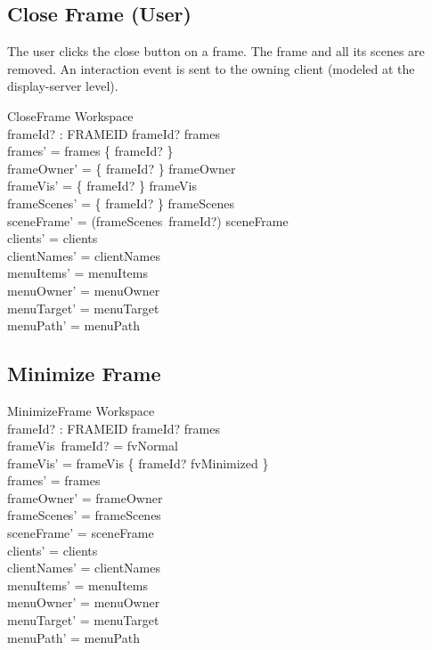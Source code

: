 \documentclass[a4paper,10pt,fleqn]{article}
\begin{document}
\subsection{Close Frame (User)}

The user clicks the close button on a frame.  The frame and all
its scenes are removed.  An interaction event is sent to the
owning client (modeled at the display-server level).

\begin{schema}{CloseFrame}
  \Delta Workspace \\
  frameId? : FRAMEID
  \where
  frameId? \in frames \\
  frames' = frames \setminus \{ frameId? \} \\
  frameOwner' = \{ frameId? \} \ndres frameOwner \\
  frameVis' = \{ frameId? \} \ndres frameVis \\
  frameScenes' = \{ frameId? \} \ndres frameScenes \\
  sceneFrame' = (frameScenes~frameId?) \ndres sceneFrame \\
  clients' = clients \\
  clientNames' = clientNames \\
  menuItems' = menuItems \\
  menuOwner' = menuOwner \\
  menuTarget' = menuTarget \\
  menuPath' = menuPath
\end{schema}

\subsection{Minimize Frame}

\begin{schema}{MinimizeFrame}
  \Delta Workspace \\
  frameId? : FRAMEID
  \where
  frameId? \in frames \\
  frameVis~frameId? = fvNormal \\
  frameVis' = frameVis \oplus \{ frameId? \mapsto fvMinimized \} \\
  frames' = frames \\
  frameOwner' = frameOwner \\
  frameScenes' = frameScenes \\
  sceneFrame' = sceneFrame \\
  clients' = clients \\
  clientNames' = clientNames \\
  menuItems' = menuItems \\
  menuOwner' = menuOwner \\
  menuTarget' = menuTarget \\
  menuPath' = menuPath
\end{schema}
\end{document}

